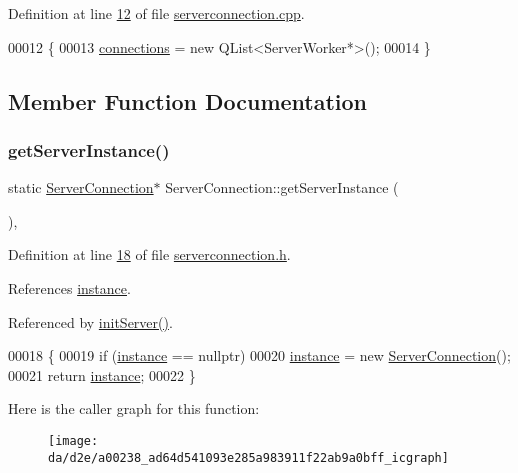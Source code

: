Definition at line \hyperlink{a00128_source_l00012}{12} of file \hyperlink{a00128_source}{serverconnection.\+cpp}.


\begin{DoxyCode}
00012                                    \{
00013   \hyperlink{a00238_a7d9e1b1ac7c2d57b439ab5918e7c31d0}{connections} = \textcolor{keyword}{new} QList<ServerWorker*>();
00014 \}
\end{DoxyCode}


\subsection{Member Function Documentation}
\mbox{\label{a00238_ad64d541093e285a983911f22ab9a0bff}} 
\subsubsection{\texorpdfstring{get\+Server\+Instance()}{getServerInstance()}}
{\footnotesize\ttfamily static \hyperlink{a00238}{Server\+Connection}$\ast$ Server\+Connection\+::get\+Server\+Instance (\begin{DoxyParamCaption}{ }\end{DoxyParamCaption})\hspace{0.3cm}{\ttfamily [inline]}, {\ttfamily [static]}}



Definition at line \hyperlink{a00131_source_l00018}{18} of file \hyperlink{a00131_source}{serverconnection.\+h}.



References \hyperlink{a00131_source_l00029}{instance}.



Referenced by \hyperlink{a00290_source_l00020}{init\+Server()}.


\begin{DoxyCode}
00018                                                       \{
00019     \textcolor{keywordflow}{if} (\hyperlink{a00238_adbbe8ffe6ee71b0aee4db9b6e689ba2a}{instance} == \textcolor{keyword}{nullptr})
00020       \hyperlink{a00238_adbbe8ffe6ee71b0aee4db9b6e689ba2a}{instance} = \textcolor{keyword}{new} \hyperlink{a00238_a0adf644e7715ddbb83a53651b0804dec}{ServerConnection}();
00021     \textcolor{keywordflow}{return} \hyperlink{a00238_adbbe8ffe6ee71b0aee4db9b6e689ba2a}{instance};
00022   \}
\end{DoxyCode}
Here is the caller graph for this function\+:
\nopagebreak
\begin{figure}[H]
\begin{center}
\leavevmode
\texttt{[image: da/d2e/a00238\_ad64d541093e285a983911f22ab9a0bff\_icgraph]}
\end{center}
\end{figure}
\mbox{\label{a00238_ae97f8eaa15a3da8f069ad502e89039ae}} 
